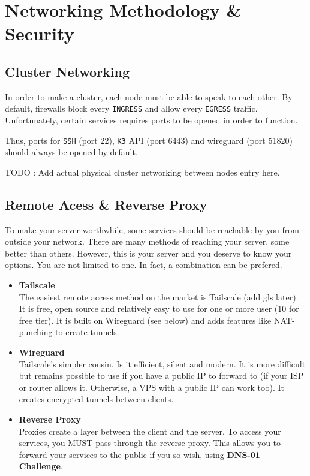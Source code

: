 \chapter{Networking Methodology \& Security} \label{chap:security}
\section{Cluster Networking}
In order to make a cluster, each node must be able to speak to each other. By default, firewalls block every \texttt{INGRESS} and allow every \texttt{EGRESS} traffic. Unfortunately, certain services requires  ports to be opened in order to function.

Thus, ports for \texttt{SSH} (port 22), \texttt{K3} API (port 6443) and wireguard (port 51820) should always be opened by default. 

TODO : Add actual physical cluster networking between nodes entry here.

\section{Remote Acess \& Reverse Proxy}
To make your server worthwhile, some services should be reachable by you from outside your network.
There are many methods of reaching your server, some better than others. However, this is your server and you deserve to know your options. You are not limited to one. In fact, a combination can be prefered. 

\begin{itemize}
	\item \textbf{Tailscale} \\
	The easiest remote access method on the market is Tailscale (add gls later). It is free, open source and relatively easy to use for one or more user (10 for free tier). It is built on Wireguard (see below) and adds features like NAT-punching to create tunnels.
	\item \textbf{Wireguard} \\
	Tailscale's simpler cousin. Is it efficient, silent and modern. It is more difficult but remains possible to use if you have a public IP to forward to (if your ISP or router allows it. Otherwise, a VPS with a public IP can work too). It creates encrypted tunnels between clients.
	\item \textbf{Reverse Proxy} \\
	Proxies create a layer between the client and the server. To access your services, you MUST pass through the reverse proxy. 
	This allows you to forward your services to the public if you so wish, using \textbf{DNS-01 Challenge}.
\end{itemize}

